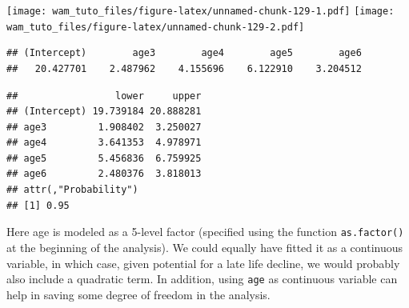 \documentclass[
  12pt,
]{book}
\newenvironment{Shaded}{\begin{snugshade}}{\end{snugshade}}
\newcommand{\FloatTok}[1]{\textcolor[rgb]{0.00,0.00,0.81}{#1}}
\newcommand{\KeywordTok}[1]{\textcolor[rgb]{0.13,0.29,0.53}{\textbf{#1}}}
\newcommand{\NormalTok}[1]{#1}
\newcommand{\OperatorTok}[1]{\textcolor[rgb]{0.81,0.36,0.00}{\textbf{#1}}}
\begin{document}
\begin{Shaded}
\end{Shaded}

\texttt{[image: wam\_tuto\_files/figure-latex/unnamed-chunk-129-1.pdf]} \texttt{[image: wam\_tuto\_files/figure-latex/unnamed-chunk-129-2.pdf]}

\begin{Shaded}
\end{Shaded}

\begin{verbatim}
## (Intercept)        age3        age4        age5        age6 
##   20.427701    2.487962    4.155696    6.122910    3.204512
\end{verbatim}

\begin{Shaded}
\end{Shaded}

\begin{verbatim}
##                 lower     upper
## (Intercept) 19.739184 20.888281
## age3         1.908402  3.250027
## age4         3.641353  4.978971
## age5         5.456836  6.759925
## age6         2.480376  3.818013
## attr(,"Probability")
## [1] 0.95
\end{verbatim}

Here age is modeled as a 5-level factor (specified using the function \texttt{as.factor()} at the beginning of the analysis). We could equally have fitted it as a continuous variable, in which case, given potential for a late life decline, we would probably also include a quadratic term.
In addition, using \texttt{age} as continuous variable can help in saving some degree of freedom in the analysis.
\end{document}
